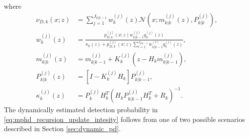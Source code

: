 where
\begin{align}
  \nu_{D,k}(x;z) &= \sum_{j=1}^{J_{k|k-1}} w_k^{(j)}(z) \mathcal{N}(x;m_{k|k}^{(j)}(z),P_{k|k}^{(j)}), \label{eq:mphd_recursion_update_intesity_detect} \\
  w_k^{(j)}(z) &= \frac{p_{D,k}^{(j)}(x;z) w_{k|k-1}^{(j)} q_k^{(j)}(z) }{\kappa_k(z) + p_{D,k}^{(j)}(x;z) \sum_{l=1}^{J_{k|k-1}} w_{k|k-1}^{(l)} q_k^{(l)}(z)}, \label{eq:mphd_recursion_update_intesity_detect_w} \\
  m_{k|k}^{(j)}(z) &= m_{k|k-1}^{(j)} + K_k^{(j)}(z-H_k m_{k|k-1}^{(j)}), \label{eq:mphd_recursion_update_intesity_detect_m} \\
  P_{k|k}^{(j)}(z) &= [I - K_k^{(j)} H_k] P_{k|k-1}^{(j)},  \label{eq:mphd_recursion_update_intesity_detect_P} \\
  \kappa_{k}^{(j)}(z) &= P_{k}^{(j)} H_k^T(H_k P_{k|k-1}^{(j)} H_k^T + R_k)^{-1}. \label{eq
  :mphd_recursion_update_intesity_detect_K}
\end{align}
The dynamically estimated detection probability in \ref{eq:mphd_recursion_update_intesity} follows from one of two
possible scenarios described in Section \ref{sec:dynamic_pd}.
